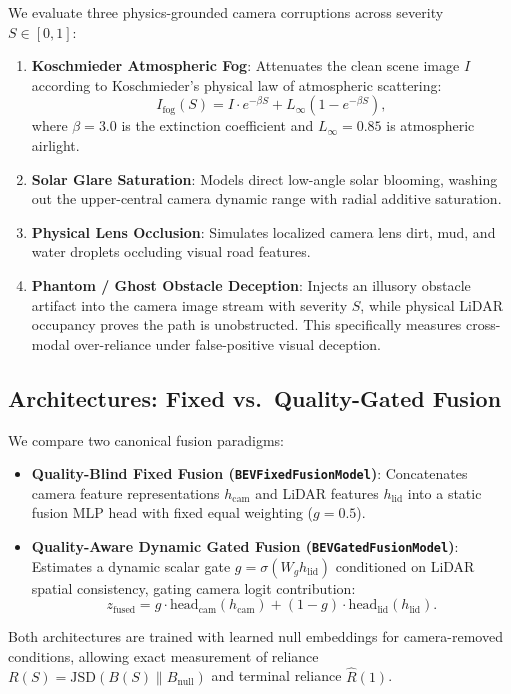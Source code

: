 \documentclass[graybox]{svmult}
\newcommand{\jsd}{\text{JSD}}
\begin{document}
We evaluate three physics-grounded camera corruptions across severity $S \in [0, 1]$:
\begin{enumerate}
    \item \textbf{Koschmieder Atmospheric Fog}: Attenuates the clean scene image $I$ according to Koschmieder's physical law of atmospheric scattering:
    \begin{equation}
        I_{\text{fog}}(S) = I \cdot e^{-\beta S} + L_{\infty} (1 - e^{-\beta S}),
    \end{equation}
    where $\beta=3.0$ is the extinction coefficient and $L_{\infty}=0.85$ is atmospheric airlight.
    \item \textbf{Solar Glare Saturation}: Models direct low-angle solar blooming, washing out the upper-central camera dynamic range with radial additive saturation.
    \item \textbf{Physical Lens Occlusion}: Simulates localized camera lens dirt, mud, and water droplets occluding visual road features.
    \item \textbf{Phantom / Ghost Obstacle Deception}: Injects an illusory obstacle artifact into the camera image stream with severity $S$, while physical LiDAR occupancy proves the path is unobstructed. This specifically measures cross-modal over-reliance under false-positive visual deception.
\end{enumerate}

\subsection{Architectures: Fixed vs.\ Quality-Gated Fusion}
We compare two canonical fusion paradigms:
\begin{itemize}
    \item \textbf{Quality-Blind Fixed Fusion (\texttt{BEVFixedFusionModel})}: Concatenates camera feature representations $h_{\text{cam}}$ and LiDAR features $h_{\text{lid}}$ into a static fusion MLP head with fixed equal weighting ($g=0.5$).
    \item \textbf{Quality-Aware Dynamic Gated Fusion (\texttt{BEVGatedFusionModel})}: Estimates a dynamic scalar gate $g = \sigma(W_g h_{\text{lid}})$ conditioned on LiDAR spatial consistency, gating camera logit contribution:
    \begin{equation}
        z_{\text{fused}} = g \cdot \text{head}_{\text{cam}}(h_{\text{cam}}) + (1 - g) \cdot \text{head}_{\text{lid}}(h_{\text{lid}}).
    \end{equation}
\end{itemize}
Both architectures are trained with learned null embeddings for camera-removed conditions, allowing exact measurement of reliance $R(S) = \jsd(B(S) \parallel B_{\text{null}})$ and terminal reliance $\hat{R}(1)$.
\end{document}
